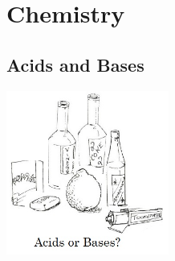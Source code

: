 \section{Chemistry}


\subsection{Acids and Bases}

\begin{center}
\includegraphics[width=0.4\textwidth]{./img/source/acids-bases-sci-meth.jpg}
\end{center}

